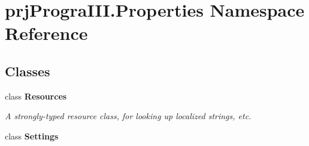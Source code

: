 \hypertarget{namespaceprj_progra_i_i_i_1_1_properties}{}\section{prj\+Progra\+I\+I\+I.\+Properties Namespace Reference}
\label{namespaceprj_progra_i_i_i_1_1_properties}
\subsection*{Classes}
\begin{DoxyCompactItemize}
\item 
class {\bfseries Resources}
\begin{DoxyCompactList}\small\item\em A strongly-\/typed resource class, for looking up localized strings, etc. \end{DoxyCompactList}\item 
class {\bfseries Settings}
\end{DoxyCompactItemize}
